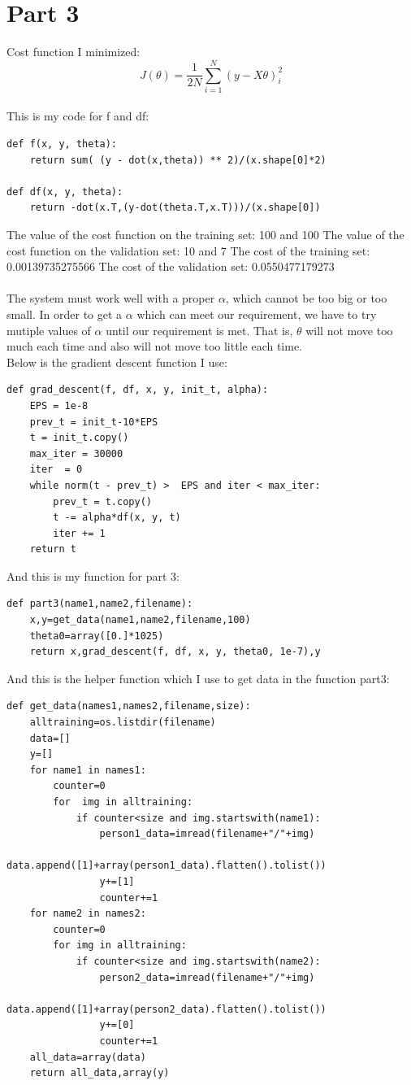 \documentclass{article}
\begin{document}
\clearpage
\section{Part 3}
Cost function I minimized: $$J(\theta) =\frac{1}{2N}\sum_{i=1}^{N}(y-X\theta)_i^{2} $$
\\
\newline This is my code for f and df:
\begin{lstlisting}
def f(x, y, theta):
    return sum( (y - dot(x,theta)) ** 2)/(x.shape[0]*2)

def df(x, y, theta):
    return -dot(x.T,(y-dot(theta.T,x.T)))/(x.shape[0])
\end{lstlisting}
The value of the cost function on the training set: 100 and 100
\newline The value of the cost function on the validation set: 10 and 7
\newline The cost of the training set: 0.00139735275566
\newline The cost of the validation set: 0.0550477179273
\\
\\
The system must work well with a proper $\alpha$, which cannot be too big or too small. In order to get a  $\alpha$ which can meet our requirement, we have to try mutiple values of $\alpha$ until our requirement is met. That is, $\theta$ will not move too much each time and also will not move too little each time.
\newline\\
Below is the gradient descent function I use:
\begin{lstlisting}
def grad_descent(f, df, x, y, init_t, alpha):
    EPS = 1e-8
    prev_t = init_t-10*EPS
    t = init_t.copy()
    max_iter = 30000
    iter  = 0
    while norm(t - prev_t) >  EPS and iter < max_iter:
        prev_t = t.copy()
        t -= alpha*df(x, y, t)
        iter += 1
    return t
\end{lstlisting}
\indent And this is my function for part 3:
\begin{lstlisting}
def part3(name1,name2,filename):
    x,y=get_data(name1,name2,filename,100)
    theta0=array([0.]*1025)
    return x,grad_descent(f, df, x, y, theta0, 1e-7),y
\end{lstlisting}
\indent And this is the helper function which I use to get data in the function part3:
\begin{lstlisting}
def get_data(names1,names2,filename,size):
    alltraining=os.listdir(filename)
    data=[]
    y=[]
    for name1 in names1:
        counter=0
        for  img in alltraining:
            if counter<size and img.startswith(name1):
                person1_data=imread(filename+"/"+img)
                data.append([1]+array(person1_data).flatten().tolist())
                y+=[1]
                counter+=1
    for name2 in names2:
        counter=0
        for img in alltraining:
            if counter<size and img.startswith(name2):
                person2_data=imread(filename+"/"+img)
                data.append([1]+array(person2_data).flatten().tolist())
                y+=[0]
                counter+=1
    all_data=array(data)
    return all_data,array(y)

\end{lstlisting}
\end{document}
